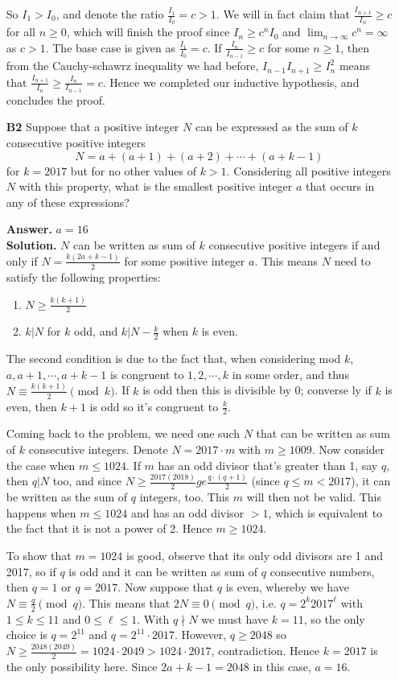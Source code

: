 \documentclass[11pt,a4paper]{article}
\newcommand{\<}{\langle}
\renewcommand{\>}{\rangle}
\begin{document}
\begin{enumerate}
So $I_1>I_0$, and denote the ratio $\frac{I_1}{I_0}=c>1$. We will in fact claim that $\frac{I_{n+1}}{I_n}\ge c$ for all $n\ge 0$, which will finish the proof since $I_n\ge c^nI_0$ and $\lim_{n\to\infty}c^n=\infty$ as $c>1$. The base case is given as $\frac{I_1}{I_0}=c$. If $\frac{I_{n}}{I_{n-1}}\ge c$ for some $n\ge 1$, then from the Cauchy-schawrz inequality we had before, $I_{n-1}I_{n+1}\ge I_n^2$ means that $\frac{I_{n+1}}{I_n}\ge \frac{I_n}{I_{n-1}}=c$. Hence we completed our inductive hypothesis, and concludes the proof. 

\item[\textbf{B2}]Suppose that a positive integer $N$ can be expressed as the sum of $k$ consecutive positive integers
\[N=a+(a+1)+(a+2)+\cdots+(a+k-1)\]for $k=2017$ but for no other values of $k>1.$ Considering all positive integers $N$ with this property, what is the smallest positive integer $a$ that occurs in any of these expressions?

\textbf{Answer.} $a=16$ \\
\textbf{Solution.} $N$ can be written as sum of $k$ consecutive positive integers if and only if $N=\frac{k(2a+k-1)}{2}$ for some positive integer $a$. This means $N$ need to satisfy the following properties: 
\begin{enumerate}
	\item $N\ge \frac{k(k+1)}{2}$
	\item $k|N$ for $k$ odd, and $k|N-\frac{k}{2}$ when $k$ is even. 
\end{enumerate}
The second condition is due to the fact that, when considering mod $k$, $a, a+1, \cdots , a+k-1$ is congruent to $1, 2, \cdots , k$ in some order, and thus $N\equiv \frac{k(k+1)}{2}\pmod{k}$. If $k$ is odd then this is divisible by 0; converse ly if $k$ is even, then $k+1$ is odd so it's congruent to $\frac{k}{2}$. 

Coming back to the problem, we need one such $N$ that can be written as sum of $k$ consecutive integers. Denote $N=2017\cdot m$ with $m\ge 1009$. Now consider the case when $m\le 1024$. If $m$ has an odd divisor that's greater than 1, say $q$, then $q|N$ too, and since $N\ge \frac{2017(2018)}{2}ge \frac{q\cdot (q+1)}{2}$ (since $q\le m< 2017$), it can be written as the sum of $q$ integers, too. This $m$ will then not be valid. This happens when $m\le 1024$ and has an odd divisor $>1$, which is equivalent to the fact that it is not a power of 2. Hence $m\ge 1024$. 

To show that $m=1024$ is good, observe that its only odd divisors are 1 and 2017, so if $q$ is odd and it can be written as sum of $q$ consecutive numbers, then $q=1$ or $q=2017$. Now suppose that $q$ is even, whereby we have $N\equiv \frac{q}{2}\pmod{q}$. This means that $2N\equiv 0\pmod{q}$, i.e. $q=2^k 2017^{\ell}$ with $1\le k\le 11$ and $0\le\ell\le 1$. With $q\nmid N$ we must have $k=11$, so the only choice is $q=2^{11}$ and $q=2^{11}\cdot 2017$. However, $q\ge 2048$ so $N\ge \frac{2048(2049)}{2}=1024\cdot 2049>1024\cdot 2017$, contradiction. Hence $k=2017$ is the only possibility here. Since $2a+k-1=2048$ in this case, $a=16$. 


\end{enumerate}
\end{document}
